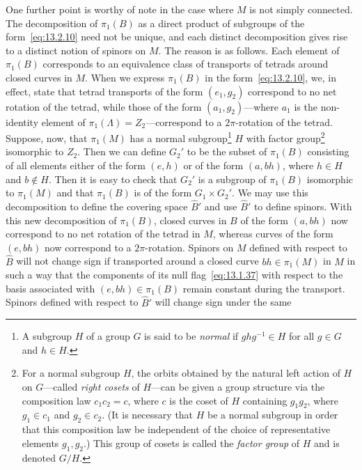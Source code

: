 One further point is worthy of note in the case where \(M\) is not simply connected.
The decomposition of \(\pi_1(B)\) as a direct product of subgroups of the
form~\eqref{eq:13.2.10} need not be unique, and each distinct decomposition gives
rise to a distinct notion of spinors on \(M\). The reason is as follows. Each
element of \(\pi_1(B)\) corresponds to an equivalence class of transports of tetrads
around closed curves in \(M\). When we express \(\pi_1(B)\) in the
form~\eqref{eq:13.2.10}, we, in effect, state that tetrad transports of the form
\((e_1,g_2)\) correspond to no net rotation of the tetrad, while those of the form
\((a_1,g_2)\)---where \(a_1\) is the non-identity element of
\(\pi_1(\Lambda)=Z_2\)---correspond to a \(2\pi\)-rotation of the tetrad. Suppose,
now, that \(\pi_1(M)\) has a normal subgroup\footnote{A subgroup \(H\) of a group
\(G\) is said to be \emph{normal} if \(ghg^{-1}\in H\) for all \(g\in G\) and
\(h\in H\).} \(H\) with factor group\footnote{For a normal subgroup \(H\), the
orbits obtained by the natural left action of \(H\) on \(G\)---called \emph{right
cosets} of \(H\)---can be given a group structure via the composition law
\(c_1c_2=c\), where \(c\) is the coset of \(H\) containing \(g_1g_2\), where
\(g_1\in c_1\) and \(g_2\in c_2\). (It is necessary that \(H\) be a normal subgroup
in order that this composition law be independent of the choice of representative
elements \(g_1,g_2\).) This group of cosets is called the \emph{factor group} of
\(H\) and is denoted \(G/H\).} isomorphic to \(Z_2\). Then we can define \(G_2'\)
to be the subset of \(\pi_1(B)\) consisting of all elements either of the form
\((e,h)\) or of the form \((a,bh)\), where \(h\in H\) and \(b\notin H\). Then it is
easy to check that \(G_2'\) is a subgroup of \(\pi_1(B)\) isomorphic to \(\pi_1(M)\)
and that \(\pi_1(B)\) is of the form \(G_1\times G_2'\). We may use this
decomposition to define the covering space \(\widehat B'\) and use \(\widehat B'\)
to define spinors. With this new decomposition of \(\pi_1(B)\), closed curves in
\(B\) of the form \((a,bh)\) now correspond to no net rotation of the tetrad in
\(M\), whereas curves of the form \((e,bh)\) now correspond to a
\(2\pi\)-rotation. Spinors on \(M\) defined with respect to \(\widehat B\) will not
change sign if transported around a closed curve \(bh\in\pi_1(M)\) in \(M\) in such a
way that the components of its null flag~\eqref{eq:13.1.37} with respect to the
basis associated with \((e,bh)\in\pi_1(B)\) remain constant during the transport.
Spinors defined with respect to \(\widehat B'\) will change sign under the same
